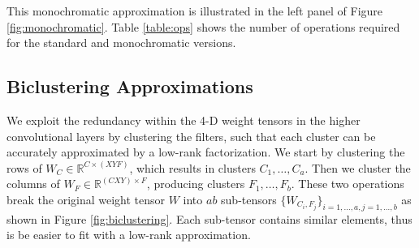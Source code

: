 %
This monochromatic approximation is illustrated in the left panel of Figure \ref{fig:monochromatic}.
Table \ref{table:ops} shows the number of operations required for the standard and monochromatic versions.

\subsection{Biclustering Approximations}\label{subsec:clustering}

We exploit the redundancy within the 4-D weight tensors in the higher convolutional layers
by clustering the filters, such that each cluster can
be accurately approximated by a low-rank factorization. 
We start by clustering the rows of $W_C \in \mathbb{R}^{C \times (XYF)}$, which results in
clusters $C_1, \dots, C_a$. Then we cluster the columns of $W_F  \in
\mathbb{R}^{(CXY) \times F}$, producing clusters $F_1,
\dots, F_b$. These two operations break the original weight tensor $W$
into $ab$ sub-tensors $\{W_{C_i, F_j}\}_{i = 1, \dots, a, j = 1,
  \dots, b}$ as shown in Figure \ref{fig:biclustering}. Each
sub-tensor contains similar elements, thus is be easier to
fit with a low-rank approximation. 

